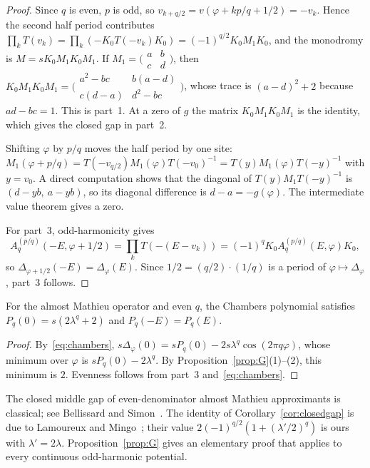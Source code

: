 \begin{proof}
Since $q$ is even, $p$ is odd, so $v_{k+q/2}=v(\varphi+kp/q+1/2)=-v_k$. Hence the second half period contributes $\prod_kT(v_k)=\prod_k(-K_0T(-v_k)K_0)=(-1)^{q/2}K_0M_1K_0$, and the monodromy is $M=sK_0M_1K_0M_1$. If $M_1=\bigl(\begin{smallmatrix}a&b\\c&d\end{smallmatrix}\bigr)$, then $K_0M_1K_0M_1=\bigl(\begin{smallmatrix}a^2-bc&b(a-d)\\c(d-a)&d^2-bc\end{smallmatrix}\bigr)$, whose trace is $(a-d)^2+2$ because $ad-bc=1$. This is part~1. At a zero of $g$ the matrix $K_0M_1K_0M_1$ is the identity, which gives the closed gap in part~2.

Shifting $\varphi$ by $p/q$ moves the half period by one site: $M_1(\varphi+p/q)=T(-v_{q/2})M_1(\varphi)T(-v_0)^{-1}=T(y)M_1(\varphi)T(-y)^{-1}$ with $y=v_0$. A direct computation shows that the diagonal of $T(y)M_1T(-y)^{-1}$ is $(d-yb,\ a-yb)$, so its diagonal difference is $d-a=-g(\varphi)$. The intermediate value theorem gives a zero.

For part~3, odd-harmonicity gives
\[
A^{(p/q)}_q(-E,\varphi+1/2)=\prod_kT(-(E-v_k))=(-1)^qK_0A^{(p/q)}_q(E,\varphi)K_0,
\]
so $\Delta_{\varphi+1/2}(-E)=\Delta_\varphi(E)$. Since $1/2=(q/2)\cdot(1/q)$ is a period of $\varphi\mapsto\Delta_\varphi$, part~3 follows.
\end{proof}

\begin{corollary}\label{cor:closedgap}
For the almost Mathieu operator and even $q$, the Chambers polynomial satisfies $P_q(0)=s(2\lambda^q+2)$ and $P_q(-E)=P_q(E)$.
\end{corollary}

\begin{proof}
By~\eqref{eq:chambers}, $s\Delta_\varphi(0)=sP_q(0)-2s\lambda^q\cos(2\pi q\varphi)$, whose minimum over $\varphi$ is $sP_q(0)-2\lambda^q$. By Proposition~\ref{prop:G}(1)--(2), this minimum is $2$. Evenness follows from part~3 and~\eqref{eq:chambers}.
\end{proof}

\begin{remark}[Priority]\label{rem:LM}
The closed middle gap of even-denominator almost Mathieu approximants is classical; see Bellissard and Simon~\cite[Theorem~3]{BellissardSimon1982}. The identity of Corollary~\ref{cor:closedgap} is due to Lamoureux and Mingo~\cite[Corollary~2.6 and Theorem~2.7]{LamoureuxMingo2007}; their value $2(-1)^{q/2}(1+(\lambda'/2)^q)$ is ours with $\lambda'=2\lambda$. Proposition~\ref{prop:G} gives an elementary proof that applies to every continuous odd-harmonic potential.
\end{remark}

